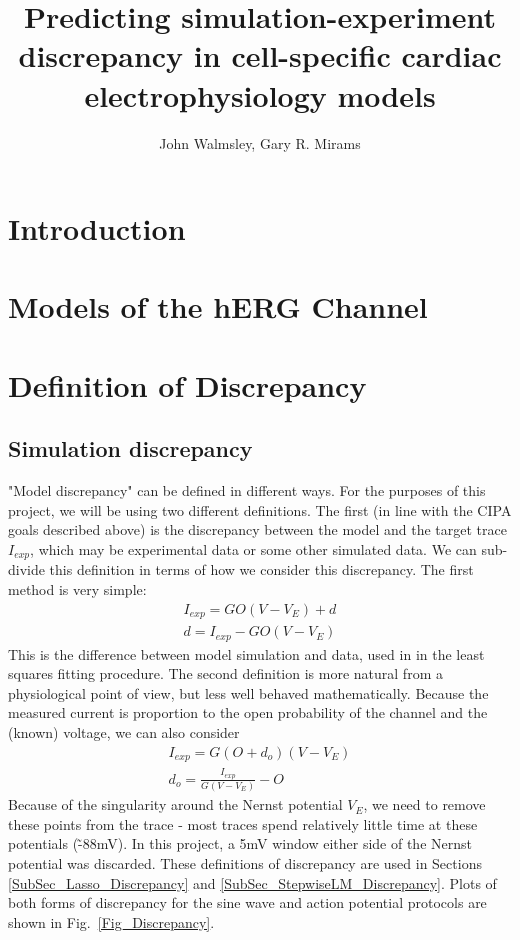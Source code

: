 \documentclass[11pt,a4paper,oneside]{article}
\author{John Walmsley, Gary R. Mirams}
\title{Predicting simulation-experiment discrepancy in cell-specific cardiac electrophysiology models}
\begin{document}
\maketitle

\section{Introduction}


\section{Models of the hERG Channel} \label{}


\section{Definition of Discrepancy} \label{ModelsOfDiscrepancy}
\subsection{Simulation discrepancy}
"Model discrepancy" can be defined in different ways. For the purposes of this project, we will be using two different definitions. The first (in line with the CIPA goals described above) is the discrepancy between the model and the target trace $I_{exp}$, which may be experimental data or some other simulated data. We can sub-divide this definition in terms of how we consider this discrepancy. The first method is very simple:
\begin{align}
	I_{exp} = G O ( V - V_E ) + d\\
	d = I_{exp} - G O ( V - V_E )
\end{align}
This is the difference between model simulation and data, used in \cite{Beattie2018} in the least squares fitting procedure. The second definition is more natural from a physiological point of view, but less well behaved mathematically. Because the measured current is proportion to the open probability of the channel and the (known) voltage, we can also consider
\begin{align}
	I_{exp} = G ( O + d_o ) ( V - V_E )\\
	d_o = \frac{I_{exp} }{ G( V - V_E ) } - O
\end{align}
Because of the singularity around the Nernst potential $V_E$, we need to remove these points from the trace - most traces spend relatively little time at these potentials (\~-88mV). In this project, a 5mV window either side of the Nernst potential was discarded. These definitions of discrepancy are used in Sections \ref{SubSec_Lasso_Discrepancy} and \ref{SubSec_StepwiseLM_Discrepancy}. Plots of both forms of discrepancy for the sine wave and action potential protocols are shown in Fig.~\ref{Fig_Discrepancy}.
\end{document}
